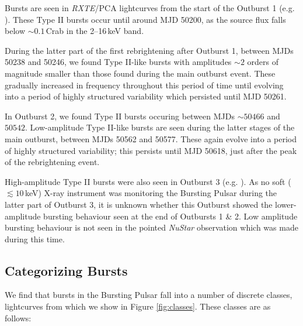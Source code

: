 \par Bursts are seen in \textit{RXTE}/PCA lightcurves from the start of the Outburst 1 (e.g. \citealp{Kouveliotou_BP}).  These Type II bursts occur until around MJD 50200, as the source flux falls below $\sim0.1$\,Crab in the 2--16\,keV band.  
\par During the latter part of the first rebrightening after Outburst 1, between MJDs 50238 and 50246, we found Type II-like bursts with amplitudes $\sim2$ orders of magnitude smaller than those found during the main outburst event.  These gradually increased in frequency throughout this period of time until evolving into a period of highly structured variability which persisted until MJD 50261.
\par In Outburst 2, we found Type II bursts occuring between MJDs $\sim50466$ and $50542$.  Low-amplitude Type II-like bursts are seen during the latter stages of the main outburst, between MJDs 50562 and 50577.  These again evolve into a period of highly structured variability; this persists until MJD 50618, just after the peak of the rebrightening event.
\par High-amplitude Type II bursts were also seen in Outburst 3 (e.g. \citealp{Linares_NewBurst}).  As no soft ($\lesssim10\,$keV) X-ray instrument was monitoring the Bursting Pulsar during the latter part of Outburst 3, it is unknown whether this Outburst showed the lower-amplitude bursting behaviour seen at the end of Outbursts 1 \& 2.  Low amplitude bursting behaviour is not seen in the pointed \textit{NuStar} observation which was made during this time.

\subsection{Categorizing Bursts}

\label{sec:classes}

\par We find that bursts in the Bursting Pulsar fall into a number of discrete classes, lightcurves from which we show in Figure \ref{fig:classes}.  These classes are as follows:

